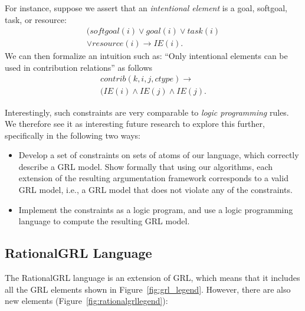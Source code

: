 For instance, suppose we assert that an \emph{intentional element} is a goal, softgoal, task, or resource: \begin{align*}
(softgoal(i)\vee goal(i)\vee task(i)\\
\vee resource(i)\rightarrow IE(i).
\end{align*}
We can then formalize an intuition such as: ``Only intentional elements can be used in contribution relations'' as follows
\begin{align*}
contrib(k,i,j,ctype)\rightarrow \\
(IE(i)\wedge IE(j)\wedge IE(j).
\end{align*}

Interestingly, such constraints are very comparable to \emph{logic programming} rules. We therefore see it as interesting future research to explore this further, specifically in the following two ways:
\begin{itemize}
\item Develop a set of constraints on sets of atoms of our language, which correctly describe a GRL model. Show formally that using our algorithms, each extension of the resulting argumentation framework corresponds to a valid GRL model, i.e., a GRL model that does not violate any of the constraints.
\item Implement the constraints as a logic program, and use a logic programming language to compute the resulting GRL model.
\end{itemize}




\iffalse%
\subsection{RationalGRL Language}
The RationalGRL language is an extension of GRL, which means that it includes all the GRL elements shown in Figure~\ref{fig:grl_legend}. However, there are also new elements (Figure~\ref{fig:rationalgrllegend}):

